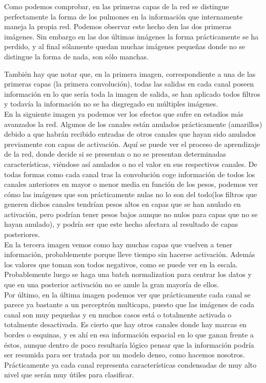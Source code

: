 \documentclass[11pt,a4paper]{article}
\theoremstyle{definition}
\begin{document}
Como podemos comprobar, en las primeras capas de la red se distingue perfectamente la forma de los pulmones en la información que internamente maneja la propia red.  Podemos observar este hecho den las dos primeras imágenes.  Sin embargo en las dos últimas imágenes la forma prácticamente se ha perdido, y al final sólamente quedan muchas imágenes pequeñas donde no se distingue la forma de nada, son sólo manchas. \

También hay que notar que, en la primera imagen,  correspondiente a una de las primeras capas (la primera convolución),  todas las salidas en cada canal poseen información en lo que sería toda la imagen de salida,  se han aplicado todos filtros y todavía la información no se ha disgregado en múltiples imágenes. \\

En la siguiente imagen ya podemos ver los efectos que sufre en estadíos más avanzados la red.  Algunos de los canales están anulados prácticamente (amarillos) debido a que habrán recibido entradas de otros canales que hayan sido anulados previamente con capas de activación. Aquí se puede ver el proceso de aprendizaje de la red, donde decide si se presentan o no se presentan determinadas características, viéndose así anulados o no el valor en sus respectivos canales.  De todas formas como cada canal tras la convolución coge información de todos los canales anteriores en mayor o menor media en función de los pesos, podemos ver cómo las imágenes que son prácticamente nulas no lo son del todo(los filtros que generen dichos canales tendrían pesos altos en capas que se han anulado en activación, pero podrían tener pesos bajos aunque no nulos para capas que no se hayan anulado), y podría ser que este hecho afectara al resultado de capas posteriores.\\

En la tercera imagen vemos como hay muchas capas que vuelven a tener información,  probablemente porque lleve tiempo sin hacerse activación.  Además los valores que toman son todos negativos, como se puede ver en la escala. Probablemente luego se haga una batch normalization para centrar los datos y que en una posterior activación no se anule la gran mayoría de ellos.\\

Por último, en la última imagen podemos ver que prácticamente cada canal se parece ya bastante a un perceptrón multicapa,  puesto que las imágenes de cada canal son muy pequeñas y en muchos casos está o totalmente activada o totalmente desactivada. Es cierto que hay otros canales donde hay marcas en bordes o esquinas, y es ahí en esa información espacial en lo que ganan frente a éstos, aunque dentro de poco resultaría lógico pensar que la información podría ser resumida para ser tratada por un modelo denso, como hacemos nosotros.  Prácticamente ya cada canal representa características condensadas de muy alto nivel que serán muy útiles para clasificar.\\
\end{document}
